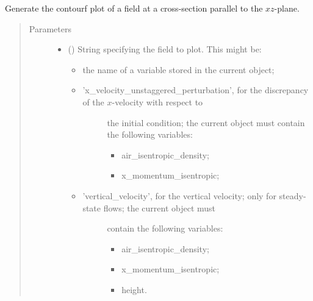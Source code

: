 \documentclass[letterpaper,10pt,english]{sphinxmanual}
\begin{document}
\begin{fulllineitems}
\begin{fulllineitems}
\label{\detokenize{api:storages.state_isentropic.StateIsentropic.contourf_xz}}
Generate the contourf plot of a field at a cross-section parallel to the \(xz\)-plane.
\begin{quote}\begin{description}
\item[{Parameters}] \leavevmode\begin{itemize}
\item {} 
 () \textendash{} 
String specifying the field to plot. This might be:
\begin{itemize}
\item {} 
the name of a variable stored in the current object;

\item {} \begin{description}
\item[{’x\_velocity\_unstaggered\_perturbation’, for the discrepancy of the \(x\)-velocity with respect to}] \leavevmode
the initial condition; the current object must contain the following variables:
\begin{itemize}
\item {} 
air\_isentropic\_density;

\item {} 
x\_momentum\_isentropic;

\end{itemize}

\end{description}

\item {} \begin{description}
\item[{’vertical\_velocity’, for the vertical velocity; only for steady-state flows; the current object must}] \leavevmode
contain the following variables:
\begin{itemize}
\item {} 
air\_isentropic\_density;

\item {} 
x\_momentum\_isentropic;

\item {} 
height.

\end{itemize}


\end{description}
\end{itemize}
\end{itemize}
\end{description}
\end{quote}
\end{fulllineitems}
\end{fulllineitems}
\end{document}
